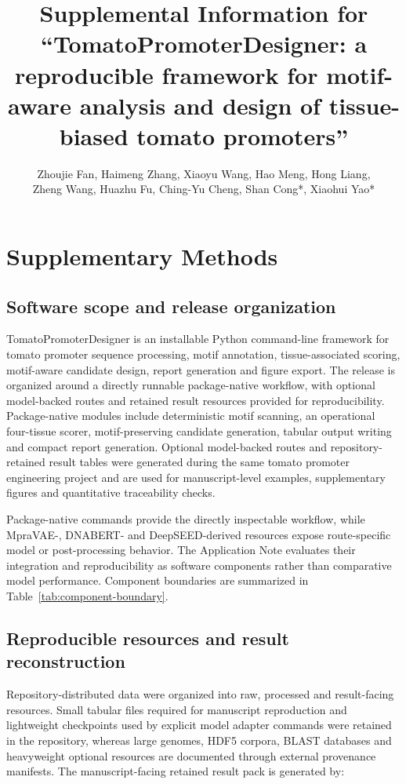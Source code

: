 \documentclass[10pt]{article}
\title{Supplemental Information for\\
``TomatoPromoterDesigner: a reproducible framework for motif-aware analysis and design of tissue-biased tomato promoters''}
\author{Zhoujie Fan, Haimeng Zhang, Xiaoyu Wang, Hao Meng, Hong Liang,\\
Zheng Wang, Huazhu Fu, Ching-Yu Cheng, Shan Cong*, Xiaohui Yao*}
\date{}
\begin{document}
\maketitle

\section{Supplementary Methods}

\subsection{Software scope and release organization}

TomatoPromoterDesigner is an installable Python command-line framework for tomato promoter sequence processing, motif annotation, tissue-associated scoring, motif-aware candidate design, report generation and figure export. The release is organized around a directly runnable package-native workflow, with optional model-backed routes and retained result resources provided for reproducibility. Package-native modules include deterministic motif scanning, an operational four-tissue scorer, motif-preserving candidate generation, tabular output writing and compact report generation. Optional model-backed routes and repository-retained result tables were generated during the same tomato promoter engineering project and are used for manuscript-level examples, supplementary figures and quantitative traceability checks.

Package-native commands provide the directly inspectable workflow, while MpraVAE-, DNABERT- and DeepSEED-derived resources expose route-specific model or post-processing behavior. The Application Note evaluates their integration and reproducibility as software components rather than comparative model performance. Component boundaries are summarized in Table~\ref{tab:component-boundary}.

\subsection{Reproducible resources and result reconstruction}

Repository-distributed data were organized into raw, processed and result-facing resources. Small tabular files required for manuscript reproduction and lightweight checkpoints used by explicit model adapter commands were retained in the repository, whereas large genomes, HDF5 corpora, BLAST databases and heavyweight optional resources are documented through external provenance manifests. The manuscript-facing retained result pack is generated by:
\end{document}
